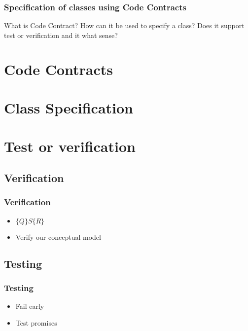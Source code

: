 

\begin{frame}
    \frametitle{Specification of classes using Code Contracts}

    What is Code Contract? How can it be used to specify a class? Does it
    support test or verification and it what sense?
\end{frame}

\section{Code Contracts}



\section{Class Specification}



\section{Test or verification}

\subsection{Verification}

\begin{frame}
    \frametitle{Verification}
    \begin{itemize}
        \item $\{Q\}S\{R\}$
        \item Verify our conceptual model
    \end{itemize}
\end{frame}

\subsection{Testing}

\begin{frame}
    \frametitle{Testing}
    \begin{itemize}
        \item Fail early
        \pause \item Test promises
    \end{itemize}
\end{frame}



